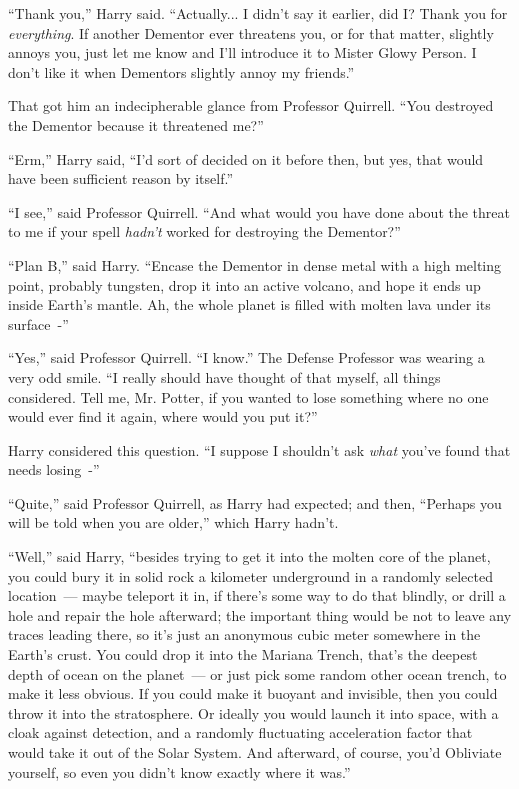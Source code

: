 ``Thank you,'' Harry said. ``Actually... I didn't say it earlier, did I? Thank you for \emph{everything}. If another Dementor ever threatens you, or for that matter, slightly annoys you, just let me know and I'll introduce it to Mister Glowy Person. I don't like it when Dementors slightly annoy my friends.''

That got him an indecipherable glance from Professor Quirrell. ``You destroyed the Dementor because it threatened me?''

``Erm,'' Harry said, ``I'd sort of decided on it before then, but yes, that would have been sufficient reason by itself.''

``I see,'' said Professor Quirrell. ``And what would you have done about the threat to me if your spell \emph{hadn't} worked for destroying the Dementor?''

``Plan B,'' said Harry. ``Encase the Dementor in dense metal with a high melting point, probably tungsten, drop it into an active volcano, and hope it ends up inside Earth's mantle. Ah, the whole planet is filled with molten lava under its surface~-''

``Yes,'' said Professor Quirrell. ``I know.'' The Defense Professor was wearing a very odd smile. ``I really should have thought of that myself, all things considered. Tell me, Mr. Potter, if you wanted to lose something where no one would ever find it again, where would you put it?''

Harry considered this question. ``I suppose I shouldn't ask \emph{what} you've found that needs losing~-''

``Quite,'' said Professor Quirrell, as Harry had expected; and then, ``Perhaps you will be told when you are older,'' which Harry hadn't.

``Well,'' said Harry, ``besides trying to get it into the molten core of the planet, you could bury it in solid rock a kilometer underground in a randomly selected location~--- maybe teleport it in, if there's some way to do that blindly, or drill a hole and repair the hole afterward; the important thing would be not to leave any traces leading there, so it's just an anonymous cubic meter somewhere in the Earth's crust. You could drop it into the Mariana Trench, that's the deepest depth of ocean on the planet~--- or just pick some random other ocean trench, to make it less obvious. If you could make it buoyant and invisible, then you could throw it into the stratosphere. Or ideally you would launch it into space, with a cloak against detection, and a randomly fluctuating acceleration factor that would take it out of the Solar System. And afterward, of course, you'd Obliviate yourself, so even you didn't know exactly where it was.''

